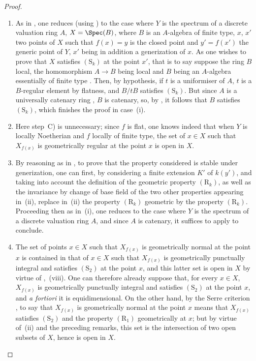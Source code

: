 \begin{proof}
\begin{enumerate}[label=(\roman*)]
  \item As in , one reduces (using ) to the case where $Y$ is the spectrum of a discrete valuation ring $A$, $X=\Spec(B)$, where $B$ is an $A$-algebra of finite type, $x$, $x'$ two points of $X$ such that $f(x)=y$ is the closed point and $y'=f(x')$ the generic point of $Y$, $x'$ being in addition a generization of $x$.
As one wishes to prove that $X$ satisfies $(\mathrm{S}_k)$ at the point $x'$, that is to say suppose the ring $B$ local, the homomorphism $A\to B$ being local and $B$ being an $A$-algebra essentially of finite type .
Then, by hypothesis, if $t$ is a uniformiser of $A$, $t$ is a $B$-regular element by flatness, and $B/tB$ satisfies $(\mathrm{S}_k)$.
But since $A$ is a universally catenary ring , $B$ is catenary, so, by , it follows that $B$ satisfies $(\mathrm{S}_k)$, which finishes the proof in case~(i).

  \item Here step~C) is unnecessary; since $f$ is flat, one knows indeed  that when $Y$ is locally Noetherian and $f$ locally of finite type, the set of $x\in X$ such that $X_{f(x)}$ is geometrically regular at the point $x$ is open in $X$.

  \item By reasoning as in , to prove that the property considered is stable under generization, one can first, by considering a finite extension $K'$ of $k(y')$, and taking into account the definition  of the geometric property $(\mathrm{R}_k)$, as well as the invariance by change of base field of the two other properties appearing in~(ii), replace in~(ii) the property $(\mathrm{R}_k)$ geometric by the property $(\mathrm{R}_k)$.
Proceeding then as in~(i), one reduces to the case where $Y$ is the spectrum of a discrete valuation ring $A$, and since $A$ is catenary, it suffices to apply  to conclude.

  \item The set of points $x\in X$ such that $X_{f(x)}$ is geometrically normal at the point $x$ is contained in that of $x\in X$ such that $X_{f(x)}$ is geometrically punctually integral and satisfies $(\mathrm{S}_2)$ at the point $x$, and this latter set is open in $X$ by virtue of ,~(viii).
One can therefore already suppose that, for every $x\in X$, $X_{f(x)}$ is geometrically punctually integral and satisfies $(\mathrm{S}_2)$ at the point $x$, and \emph{a fortiori} it is equidimensional.
On the other hand, by the Serre criterion , to say that $X_{f(x)}$ is geometrically normal at the point $x$ means that $X_{f(x)}$ satisfies $(\mathrm{S}_2)$ and the property $(\mathrm{R}_1)$ geometrically at $x$;
but by virtue of~(ii) and the preceding remarks, this set is the intersection of two open subsets of $X$, hence is open in $X$.
\end{enumerate}
\end{proof}


